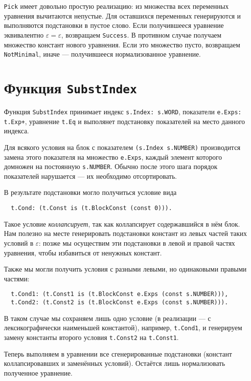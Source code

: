 \documentclass[12pt]{article}
\begin{document}
\texttt{Pick} имеет довольно простую реализацию: из множества всех переменных
уравнения вычитаются непустые. Для оставшихся переменных генерируются
и выполняются подстановки в пустое слово. Если получившееся уравнение
эквивалентно $\varepsilon = \varepsilon$, возвращаем \texttt{Success}.
В противном случае получаем множество констант нового уравнения. Если это
множество пусто, возвращаем \texttt{NotMinimal}, иначе --- получившееся
нормализованное уравнение.



\section{Функция \texttt{SubstIndex}}

Функция \texttt{SubstIndex} принимает индекс \texttt{s.Index: s.WORD},
показатели \texttt{e.Exps: t.Exp+}, уравнение \texttt{t.Eq} и выполянет
подстановку показателей на место данного индекса.

Для всякого условия на блок с показателем \texttt{(s.Index s.NUMBER)}
производится замена этого показателя на множество \texttt{e.Exps},
каждый элемент которого домножен на постоянную \texttt{s.NUMBER}.
Обычно после этого шага порядок показателей нарушается --- их
необходимо отсортировать.

В результате подстановки могло получиться условие вида
\begin{Verbatim}
  t.Cond: (t.Const is (t.BlockConst (const 0))).
\end{Verbatim}
Такое условие \textit{коллапсирует}, так как коллапсирует содержавшийся в нём
блок. Нам полезно на месте генерировать подстановки констант из левых частей
таких условий в $\varepsilon$: позже мы осуществим эти подстановки в левой и
правой частях уравнения, чтобы избавиться от ненужных констант.

Также мы могли получить условия с разными левыми, но одинаковыми правыми
частями:
\begin{Verbatim}
  t.Cond1: (t.Const1 is (t.BlockConst e.Exps (const s.NUMBER))),
  t.Cond2: (t.Const2 is (t.BlockConst e.Exps (const s.NUMBER))).
\end{Verbatim}
В таком случае мы сохраняем лишь одно условие (в реализации --- с
лексикографически наименьшей константой), например, \texttt{t.Cond1}, и
генерируем замену константы второго условия \texttt{t.Const2} на
\texttt{t.Const1}.

Теперь выполняем в уравнении все сгенерированные подстановки (констант
коллапсировавших и заменённых условий). Остаётся лишь нормализовать полученное
уравнение.
\end{document}

